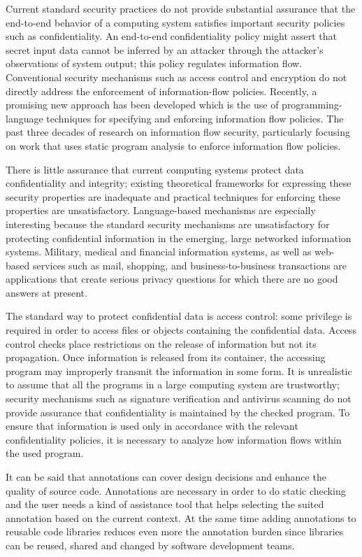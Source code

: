 Current standard security practices do not provide
substantial assurance that the end-to-end behavior of a
computing system satisfies important security policies such as
confidentiality. An end-to-end confidentiality policy might assert
that secret input data cannot be inferred by an attacker through
the attacker's observations of system output; this policy regulates
information flow.
Conventional security mechanisms such as access control
and encryption do not directly address the enforcement of
information-flow policies. Recently, a promising new approach
has been developed which is the use of programming-language techniques
for specifying and enforcing information flow policies.
The past three decades of research on
information flow security, particularly focusing on work that uses
static program analysis to enforce information flow policies. 

There is little assurance that
current computing systems protect data confidentiality and
integrity; existing theoretical frameworks for expressing these
security properties are inadequate and practical techniques for
enforcing these properties are unsatisfactory. Language-based mechanisms are especially interesting because
the standard security mechanisms are unsatisfactory
for protecting confidential information in the emerging, large
networked information systems. Military, medical and financial
information systems, as well as web-based services such
as mail, shopping, and business-to-business transactions are
applications that create serious privacy questions for which
there are no good answers at present.

The standard way to protect confidential data is access control: some privilege is required in order to
access files or objects containing the confidential data. Access
control checks place restrictions on the release of information
but not its propagation. Once information is released from
its container, the accessing program may improperly transmit the information in some form. It is
unrealistic to assume that all the programs in a large computing
system are trustworthy; security mechanisms such as signature
verification and antivirus scanning do not provide assurance
that confidentiality is maintained by the checked program. To
ensure that information is used only in accordance with the
relevant confidentiality policies, it is necessary to analyze how
information flows within the used program.

It can be said that annotations can cover design decisions and enhance the quality of source code. Annotations are necessary in order to do static checking and the user needs a kind of assistance tool that helps selecting the suited annotation based on the current context. At the same time adding annotations to reusable code libraries reduces even more the annotation burden since libraries can be reused, shared and changed by software development teams.

